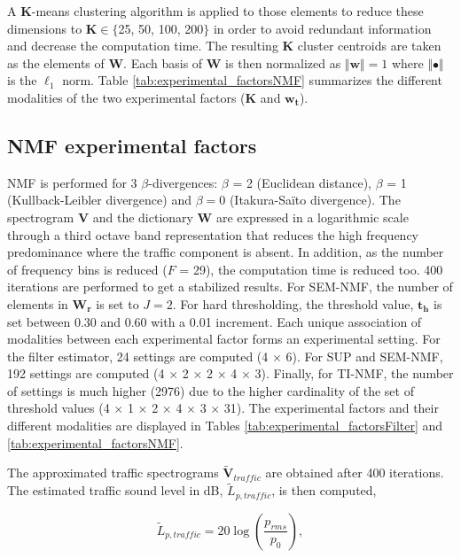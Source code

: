 \documentclass[review,5p,twocolumn,sort&compress,times]{elsarticle}
\begin{document}
A $\mathbf{K}$-means clustering algorithm is applied to those elements to reduce these dimensions to $\mathbf{K} \in \lbrace$25, 50, 100, 200$\rbrace$ in order to avoid redundant information and decrease the computation time. The resulting $\mathbf{K}$ cluster centroids are taken as the elements of $\mathbf{W}$. Each basis of $\mathbf{W}$ is then normalized as $ \Vert \mathbf{w} \Vert = 1$ where $\Vert \bullet \Vert$ is the $\ell_1$ norm. Table \ref{tab:experimental_factorsNMF} summarizes the different modalities of the two experimental factors ($\mathbf{K}$ and $\mathbf{w_t}$).

\subsection{NMF experimental factors}

NMF is performed for 3 $\beta$-divergences: $\beta$ = 2 (Euclidean distance), $\beta$ = 1 (Kullback-Leibler divergence) and $\beta = 0$ (Itakura-Sa\"ito divergence). The spectrogram $\mathbf{V}$ and the dictionary $\mathbf{W}$ are expressed in a logarithmic scale through a third octave band representation that reduces the high frequency predominance where the traffic component is absent. In addition, as the number of frequency bins is reduced ($F$ = 29), the computation time is reduced too. 400 iterations are performed to get a stabilized results. For SEM-NMF, the number of elements in $\mathbf{W_r}$ is set to $J = 2$. For hard thresholding, the threshold value, $\mathbf{t_h}$ is set between 0.30 and 0.60 with a 0.01 increment.
Each unique association of modalities between each experimental factor forms an experimental setting. For the filter estimator, 24 settings are computed (4 $\times$ 6). For SUP and SEM-NMF, 192 settings are computed (4 $\times$ 2 $\times$ 2 $\times$ 4 $\times$ 3). Finally, for TI-NMF, the number of settings is much higher (2976) due to the higher cardinality of the set of threshold values (4 $\times$ 1 $\times$ 2 $\times$ 4  $\times$ 3 $\times$ 31).
The experimental factors and their different modalities are displayed in Tables \ref{tab:experimental_factorsFilter} and \ref{tab:experimental_factorsNMF}.

The approximated traffic spectrograms $\mathbf{\tilde{V}}_{traffic}$ are obtained after 400 iterations. The estimated traffic sound level in dB, $\tilde{L}_{p, traffic}$, is then computed,

\begin{equation}
\tilde{L}_{p, traffic} = 20\log\left(\frac{p_{rms}}{p_0}\right),
\end{equation}
\end{document}

